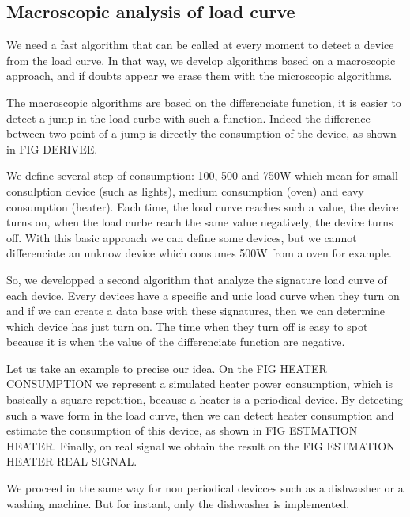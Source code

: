 \subsection{Macroscopic analysis of load curve}

We need a fast algorithm that can be called at every moment to detect a device from the load curve. In that way, we develop algorithms based on a macroscopic approach, and if doubts appear we erase them with the microscopic algorithms.

The macroscopic algorithms are based on the differenciate function, it is easier to detect a jump in the load curbe with such a function. Indeed the difference between two point of a jump is directly the consumption of the device, as shown in FIG DERIVEE.

We define several step of consumption: 100, 500 and 750W which mean for small consulption device (such as lights), medium consumption (oven) and eavy consumption (heater). Each time, the load curve reaches such a value, the device turns on, when the load curbe reach the same value negatively, the device turns off. With this basic approach we can define some devices, but we cannot differenciate an unknow device which consumes 500W from a oven for example.

So, we developped a second algorithm that analyze the signature load curve of each device. Every devices have a specific and unic load curve when they turn on and if we can create a data base with these signatures, then we can determine which device has just turn on. The time when they turn off is easy to spot because it is when the value of the differenciate function are negative.

Let us take an example to precise our idea. On the FIG HEATER CONSUMPTION we represent a simulated heater power consumption, which is basically a square repetition, because a heater is a periodical device. By detecting such a wave form in the load curve, then we can detect heater consumption and estimate the consumption of this device, as shown in FIG ESTMATION HEATER. Finally, on real signal we obtain the result on the FIG ESTMATION HEATER REAL SIGNAL.

We proceed in the same way for non periodical devicces such as a dishwasher or a washing machine. But for instant, only the dishwasher is implemented.


